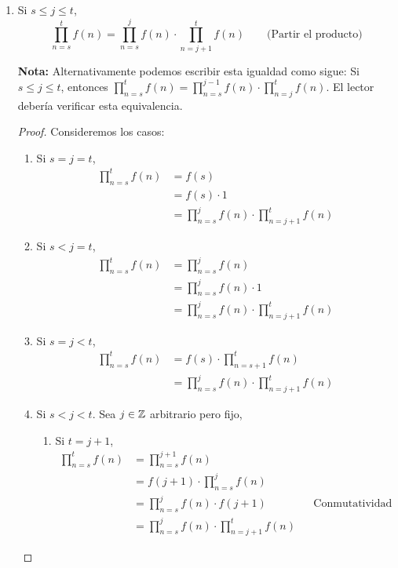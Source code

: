\begin{enumerate}[label=\alph*)]
    \item Si $s\leq j \leq t$, \[\prod_{n=s}^{t} f(n) = \prod_{n=s}^{j} f(n) \cdot \prod_{n=j+1}^{t} f(n)\qquad \text{(Partir el producto)}\]
    
    \textbf{Nota:} Alternativamente podemos escribir esta igualdad como sigue: Si $s\leq j\leq t$, entonces $\prod_{n=s}^{t} f(n) = \prod_{n=s}^{j-1} f(n) \cdot \prod_{n=j}^{t} f(n)$. El lector debería verificar esta equivalencia.
    
    \begin{proof}\leavevmode
      Consideremos los casos:
      \begin{enumerate}[label=\Roman*)]
        \item Si $s=j=t$,
        \begin{align*}
          \prod_{n=s}^{t} f(n) &= f(s)\\
          &= f(s) \cdot 1\\
          &= \prod_{n=s}^{j} f(n) \cdot \prod_{n=j+1}^{t} f(n)
        \end{align*}
        
        \item Si $s<j=t$,
        \begin{align*}
          \prod_{n=s}^{t} f(n) &= \prod_{n=s}^{j} f(n)\\
          &= \prod_{n=s}^{j} f(n) \cdot 1\\
          &= \prod_{n=s}^{j} f(n) \cdot \prod_{n=j+1}^{t} f(n)
        \end{align*}
        
        \item Si $s=j<t$,
        \begin{align*}
          \prod_{n=s}^{t} f(n) &= f(s) \cdot \prod_{n=s+1}^{t} f(n)\\
          &= \prod_{n=s}^{j} f(n) \cdot \prod_{n=j+1}^{t} f(n)
        \end{align*}
        
        \item Si $s<j<t$. Sea $j\in \mathbb{Z}$ arbitrario pero fijo,
        \begin{enumerate}[label=\roman*)]
          \item Si $t=j+1$,
          \begin{align*}
            \prod_{n=s}^{t} f(n) &=\prod_{n=s}^{j+1} f(n) \\
            &= f(j+1) \cdot \prod_{n=s}^{j} f(n)\\
            &= \prod_{n=s}^{j} f(n) \cdot f(j+1) && \text{Conmutatividad}\\
            &= \prod_{n=s}^{j} f(n) \cdot \prod_{n=j+1}^{t} f(n)
          \end{align*}
          

\end{enumerate}
\end{enumerate}
\end{proof}
\end{enumerate}
